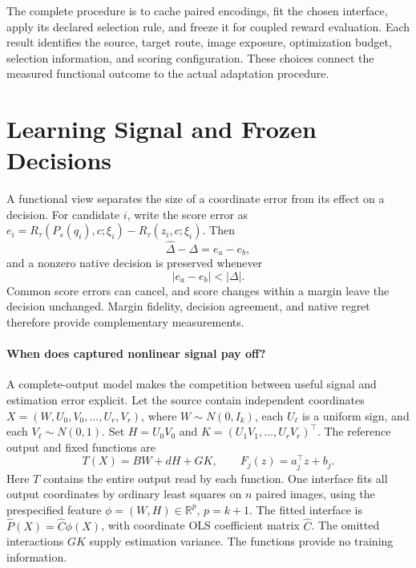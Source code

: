\documentclass[10pt,twocolumn,letterpaper]{article}
\newcommand{\R}{\mathbb R}
\begin{document}
The complete procedure is to cache paired encodings, fit the chosen interface, apply its declared selection rule, and freeze it for coupled reward evaluation. Each result identifies the source, target route, image exposure, optimization budget, selection information, and scoring configuration. These choices connect the measured functional outcome to the actual adaptation procedure.

\section{Learning Signal and Frozen Decisions}
\label{sec:analysis}
A functional view separates the size of a coordinate error from its effect on a decision. For candidate $i$, write the score error as
$e_i=R_\tau(P_s(q_i),c;\xi_i)-R_\tau(z_i,c;\xi_i)$.
Then
\begin{equation}
 \widehat\Delta-\Delta=e_a-e_b,
 \label{eq:pairerror}
\end{equation}
and a nonzero native decision is preserved whenever
\begin{equation}
 |e_a-e_b|<|\Delta|.
 \label{eq:margin}
\end{equation}
Common score errors can cancel, and score changes within a margin leave the decision unchanged. Margin fidelity, decision agreement, and native regret therefore provide complementary measurements.

\paragraph{When does captured nonlinear signal pay off?}
A complete-output model makes the competition between useful signal and estimation error explicit. Let the source contain independent coordinates $X=(W,U_0,V_0,\ldots,U_r,V_r)$, where $W\sim N(0,I_k)$, each $U_\ell$ is a uniform sign, and each $V_\ell\sim N(0,1)$. Set $H=U_0V_0$ and $K=(U_1V_1,\ldots,U_rV_r)^\top$. The reference output and fixed functions are
\begin{equation}
 T(X)=BW+dH+GK,\qquad F_j(z)=a_j^\top z+b_j.
 \label{eq:supportmodel}
\end{equation}
Here $T$ contains the entire output read by each function. One interface fits all output coordinates by ordinary least squares on $n$ paired images, using the prespecified feature $\phi=(W,H)\in\R^p$, $p=k+1$. The fitted interface is $\widehat P(X)=\widehat C\phi(X)$, with coordinate OLS coefficient matrix $\widehat C$. The omitted interactions $GK$ supply estimation variance. The functions provide no training information.
\end{document}
